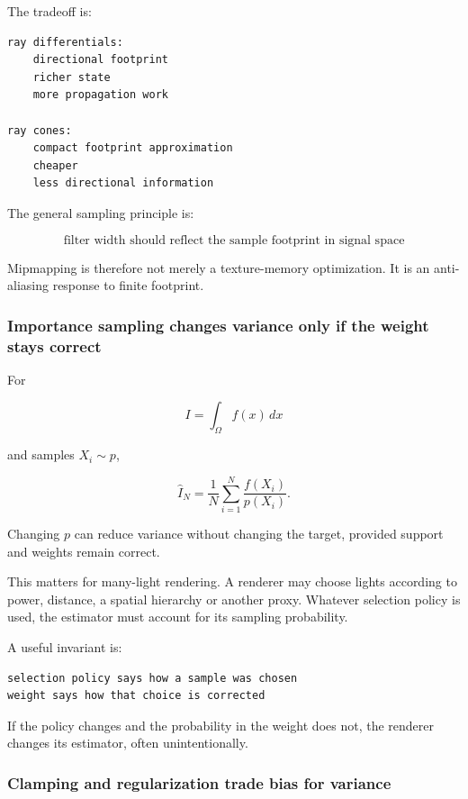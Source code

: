 The tradeoff is:

\begin{verbatim}
ray differentials:
    directional footprint
    richer state
    more propagation work

ray cones:
    compact footprint approximation
    cheaper
    less directional information
\end{verbatim}

The general sampling principle is:

\[
\boxed{
\text{filter width should reflect the sample footprint in signal space}
}
\]

Mipmapping is therefore not merely a texture-memory optimization. It is an anti-aliasing response to finite footprint.

\subsubsection{Importance sampling changes variance only if the weight stays correct}\label{03-visual-computing-i-ch001-importance-sampling-changes-variance-only-if-the-weight-stays-correct}

For

\[
I=\int_\Omega f(x)\,dx
\]

and samples \(X_i\sim p\),

\[
\widehat I_N=
\frac1N
\sum_{i=1}^{N}
\frac{f(X_i)}{p(X_i)}.
\]

Changing \(p\) can reduce variance without changing the target, provided support and weights remain correct.

This matters for many-light rendering. A renderer may choose lights according to power, distance, a spatial hierarchy or another proxy. Whatever selection policy is used, the estimator must account for its sampling probability.

A useful invariant is:

\begin{verbatim}
selection policy says how a sample was chosen
weight says how that choice is corrected
\end{verbatim}

If the policy changes and the probability in the weight does not, the renderer changes its estimator, often unintentionally.

\subsubsection{Clamping and regularization trade bias for variance}\label{03-visual-computing-i-ch001-clamping-and-regularization-trade-bias-for-variance}

